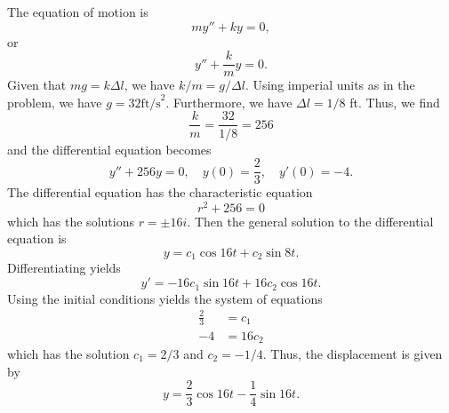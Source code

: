 \documentclass[11pt, titlepage]{article}
\begin{document}
  \begin{solution}
      The equation of motion is
      \[
      my'' + ky = 0,
      \] 
      or
      \[
      y'' + \frac{k}{m} y = 0.
      \] 
      Given that $mg = k \Delta l$, we have $k / m = g / \Delta l$. Using
      imperial units as in the problem, we have $g = 32 \text{ft/s}^2$.
      Furthermore, we have $\Delta l = 1/8$ ft. Thus, we find
      \[
     \frac{k}{m} = \frac{32}{1/8} = 256 
      \] 
      and the differential equation becomes
      \[
          y'' + 256 y = 0, \quad y(0) = \frac{2}{3}, \quad y'(0) = -4. 
      \] 
      The differential equation has the characteristic equation
      \[
      r^2 + 256 = 0
      \] 
      which has the solutions $r = \pm 16i$. Then the general solution to the
      differential equation is
      \[
      y = c_1 \cos 16t + c_2 \sin 8t.
      \] 
      Differentiating yields
      \[
      y' = -16 c_1 \sin 16t + 16 c_2 \cos 16t.
      \] 
      Using the initial conditions yields the system of equations
      \begin{align*}
          \frac{2}{3} &= c_1 \\
          -4 &= 16 c_2
      \end{align*}
      which has the solution $c_1 = 2/3$ and $c_2 = -1/4$. Thus, the
      displacement is given by
      \[
      y = \frac{2}{3} \cos 16t - \frac{1}{4} \sin 16t.
      \] 
  \end{solution}
\end{document}
